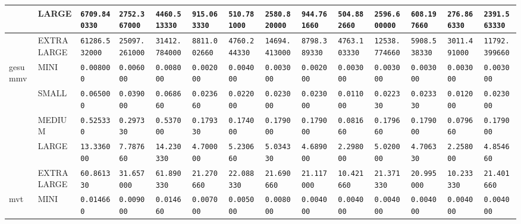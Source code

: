 \begin{tabular}{l | l | l | l | l | l | l | l | l | l | l | l | l | l}
             & LARGE      & \verb|6709.840330  | & \verb|2752.367000 | & \verb|4460.513330 | & \verb|915.063330  | & \verb|510.781000  | & \verb|2580.820000 | & \verb|944.761660  | & \verb|504.882660  | & \verb|2596.600000 | & \verb|608.197660  | & \verb|276.866330  | & \verb|2391.563330 | \\ \hline
             & EXTRALARGE & \verb|61286.532000 | & \verb|25097.261000| & \verb|31412.784000| & \verb|8811.002660 | & \verb|4760.244330 | & \verb|14694.413000| & \verb|8798.389330 | & \verb|4763.103330 | & \verb|12538.774660| & \verb|5908.538330 | & \verb|3011.491000 | & \verb|11792.399660| \\ \hline
    gesummv  & MINI       & \verb|0.008000     | & \verb|0.006000    | & \verb|0.008000    | & \verb|0.002000    | & \verb|0.004000    | & \verb|0.003000    | & \verb|0.002000    | & \verb|0.003000    | & \verb|0.003000    | & \verb|0.003000    | & \verb|0.003000    | & \verb|0.003000    | \\ \hline
             & SMALL      & \verb|0.065000     | & \verb|0.039000    | & \verb|0.068660    | & \verb|0.023660    | & \verb|0.022000    | & \verb|0.023000    | & \verb|0.023000    | & \verb|0.011000    | & \verb|0.022330    | & \verb|0.023330    | & \verb|0.012000    | & \verb|0.023000    | \\ \hline
             & MEDIUM     & \verb|0.525330     | & \verb|0.297330    | & \verb|0.537000    | & \verb|0.179330    | & \verb|0.174000    | & \verb|0.179000    | & \verb|0.179000    | & \verb|0.081660    | & \verb|0.179660    | & \verb|0.179000    | & \verb|0.079660    | & \verb|0.179000    | \\ \hline
             & LARGE      & \verb|13.336000    | & \verb|7.787660    | & \verb|14.230330   | & \verb|4.700000    | & \verb|5.230660    | & \verb|5.034330    | & \verb|4.689000    | & \verb|2.298000    | & \verb|5.020000    | & \verb|4.706330    | & \verb|2.258000    | & \verb|4.854660    | \\ \hline
             & EXTRALARGE & \verb|60.861330    | & \verb|31.657000   | & \verb|61.890330   | & \verb|21.270660   | & \verb|22.088330   | & \verb|21.690660   | & \verb|21.117000   | & \verb|10.421660   | & \verb|21.371330   | & \verb|20.995000   | & \verb|10.233330   | & \verb|21.401660   | \\ \hline
    mvt      & MINI       & \verb|0.014660     | & \verb|0.009000    | & \verb|0.014660    | & \verb|0.007000    | & \verb|0.005000    | & \verb|0.008000    | & \verb|0.004000    | & \verb|0.004000    | & \verb|0.004000    | & \verb|0.004000    | & \verb|0.004000    | & \verb|0.004000    | \\ \hline

\end{tabular}
